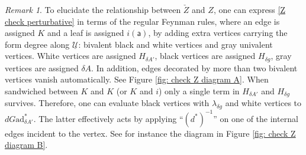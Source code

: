 \documentclass[11pt,a4paper]{amsart}
\theoremstyle{plain} %
\theoremstyle{definition}
\theoremstyle{remark}
\newtheorem{rem}[thm]{Remark}
\newcommand{\g}{\mathfrak{g}}
\newcommand{\mr}{\mathrm}
\newcommand{\sfa}{\mathsf{a}}
\newcommand{\mc}{\mathcal}
\newcommand{\UU}{\underline{\mc{U}}}
\begin{document}
{\begin{rem}\label{rem: feynman rules check Z }
    To elucidate the relationship between $\check{Z}$ and $Z$, one can express \eqref{Z check perturbative} in terms of the regular Feynman rules, where an edge is assigned $K$ and a leaf is assigned $i(\sfa)$, by adding extra vertices carrying the form degree along $\UU$: bivalent black and white vertices and gray univalent vertices. White vertices are assigned $H_{\delta A'}$, black vertices are assigned $H_{\delta g}$, gray vertices are assigned $\delta A$. In addition, edges decorated by more than two bivalent vertices vanish automatically. See Figure \ref{fig: check Z diagram A}.  
    When sandwiched between $K$ and $K$ (or $K$ and $i$) only a single term in $H_{\delta A'}$ and $H_{\delta g}$ survives. Therefore, one can evaluate black vertices with $\lambda_{\delta g}$ and white vertices to $dG\mr{ad}^*_{\delta A'}$. The latter effectively acts by applying ``$(d^*)^{-1}$'' on one of the internal edges incident to the vertex. See for instance the diagram in Figure \ref{fig: check Z diagram B}.
\end{rem}
\begin{figure}
\centering


\end{figure}}
\end{document}
